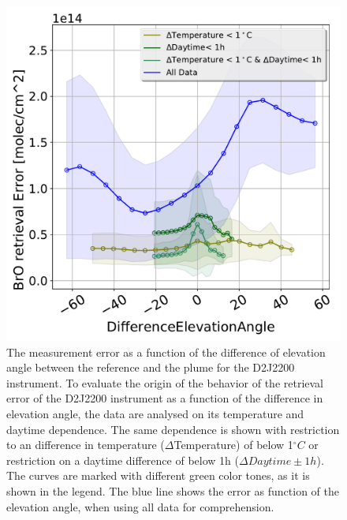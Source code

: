 \begin{figure}
	\centering
	\includegraphics[width=0.7\linewidth]{Bilder/DiffElevAngleKomischesInstr}
	\caption{The  measurement error as a function of the difference of elevation angle between the reference and the plume for the D2J2200 instrument. To evaluate the origin of the behavior of the  retrieval error of the D2J2200 instrument as a function of the difference in elevation angle, the data are analysed on its temperature and daytime dependence. The same dependence is shown with restriction to an difference in temperature ($\Delta$Temperature) of below 1$^{\circ}C$ or restriction on a daytime difference of below 1h ($\Delta Daytime \pm 1h$). The curves are marked with different green color tones, as it is shown in the legend. The blue line shows the  error as function of the elevation angle, when using all data for comprehension.}
	\label{fig:d2j22000diffelevangleonetempnevad}
\end{figure}


